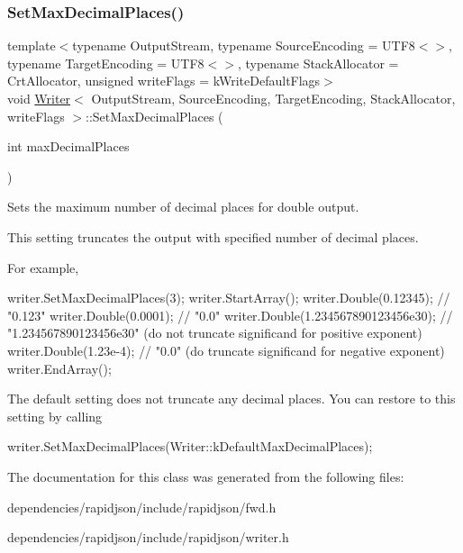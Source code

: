 \subsubsection{\texorpdfstring{Set\+Max\+Decimal\+Places()}{SetMaxDecimalPlaces()}}
{\footnotesize\ttfamily template$<$typename Output\+Stream, typename Source\+Encoding = U\+T\+F8$<$$>$, typename Target\+Encoding = U\+T\+F8$<$$>$, typename Stack\+Allocator = Crt\+Allocator, unsigned write\+Flags = k\+Write\+Default\+Flags$>$ \\
void \hyperlink{class_writer}{Writer}$<$ Output\+Stream, Source\+Encoding, Target\+Encoding, Stack\+Allocator, write\+Flags $>$\+::Set\+Max\+Decimal\+Places (\begin{DoxyParamCaption}\item[{int}]{max\+Decimal\+Places }\end{DoxyParamCaption})\hspace{0.3cm}{\ttfamily [inline]}}



Sets the maximum number of decimal places for double output. 

This setting truncates the output with specified number of decimal places.

For example,


\begin{DoxyCode}
writer.SetMaxDecimalPlaces(3);
writer.StartArray();
writer.Double(0.12345);                 \textcolor{comment}{// "0.123"}
writer.Double(0.0001);                  \textcolor{comment}{// "0.0"}
writer.Double(1.234567890123456e30);    \textcolor{comment}{// "1.234567890123456e30" (do not truncate significand for positive
       exponent)}
writer.Double(1.23e-4);                 \textcolor{comment}{// "0.0"                  (do truncate significand for negative
       exponent)}
writer.EndArray();
\end{DoxyCode}


The default setting does not truncate any decimal places. You can restore to this setting by calling 
\begin{DoxyCode}
writer.SetMaxDecimalPlaces(Writer::kDefaultMaxDecimalPlaces);
\end{DoxyCode}
 

The documentation for this class was generated from the following files\+:\begin{DoxyCompactItemize}
\item 
dependencies/rapidjson/include/rapidjson/fwd.\+h\item 
dependencies/rapidjson/include/rapidjson/writer.\+h\end{DoxyCompactItemize}
